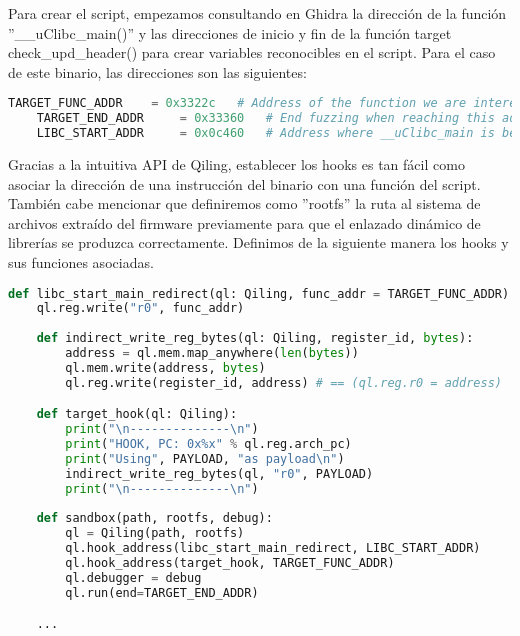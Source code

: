 Para crear el script, empezamos consultando en Ghidra la dirección de la función ''\_\_uClibc\_main()'' y las direcciones de 
inicio y fin de la función target check\_upd\_header() para crear variables reconocibles en el script. Para el caso de este 
binario, las direcciones son las siguientes:

\begin{lstlisting}[language=python, caption=Declaración de constantes: Direcciones de interés en funciones., captionpos=b,
     frame=single, breaklines]
    TARGET_FUNC_ADDR    = 0x3322c   # Address of the function we are interested in
    TARGET_END_ADDR     = 0x33360   # End fuzzing when reaching this address
    LIBC_START_ADDR     = 0x0c460   # Address where __uClibc_main is being called
\end{lstlisting}

Gracias a la intuitiva API de Qiling, establecer los hooks es tan fácil como asociar la dirección de una instrucción del binario
con una función del script. También cabe mencionar que definiremos como ''rootfs'' la ruta al sistema de archivos extraído del
firmware previamente para que el enlazado dinámico de librerías se produzca correctamente. Definimos de la siguiente manera los
hooks y sus funciones asociadas.

\begin{lstlisting}[language=python, caption=Definición de hooks del script de emulación para Qiling., captionpos=b,
    frame=single, breaklines]
    def libc_start_main_redirect(ql: Qiling, func_addr = TARGET_FUNC_ADDR):
    ql.reg.write("r0", func_addr)
    
    def indirect_write_reg_bytes(ql: Qiling, register_id, bytes):
        address = ql.mem.map_anywhere(len(bytes))
        ql.mem.write(address, bytes)
        ql.reg.write(register_id, address) # == (ql.reg.r0 = address) 

    def target_hook(ql: Qiling):    
        print("\n--------------\n")
        print("HOOK, PC: 0x%x" % ql.reg.arch_pc)
        print("Using", PAYLOAD, "as payload\n")
        indirect_write_reg_bytes(ql, "r0", PAYLOAD)
        print("\n--------------\n")
        
    def sandbox(path, rootfs, debug):    
        ql = Qiling(path, rootfs)
        ql.hook_address(libc_start_main_redirect, LIBC_START_ADDR)
        ql.hook_address(target_hook, TARGET_FUNC_ADDR)     
        ql.debugger = debug
        ql.run(end=TARGET_END_ADDR)

    ...
\end{lstlisting}

